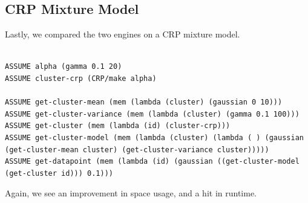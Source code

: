 \documentclass[10pt]{article}
\begin{document}
\begin{verbatim}
\end{verbatim}

\subsection{CRP Mixture Model}

Lastly, we compared the two engines on a CRP mixture model.

\begin{leftbar} \begin{small} \begin{verbatim}

ASSUME alpha (gamma 0.1 20)
ASSUME cluster-crp (CRP/make alpha)

ASSUME get-cluster-mean (mem (lambda (cluster) (gaussian 0 10)))
ASSUME get-cluster-variance (mem (lambda (cluster) (gamma 0.1 100)))
ASSUME get-cluster (mem (lambda (id) (cluster-crp)))
ASSUME get-cluster-model (mem (lambda (cluster) (lambda ( ) (gaussian (get-cluster-mean cluster) (get-cluster-variance cluster)))))
ASSUME get-datapoint (mem (lambda (id) (gaussian ((get-cluster-model (get-cluster id))) 0.1)))
\end{verbatim} \end{small} \end{leftbar}

Again, we see an improvement in space usage, and a hit in runtime.
\end{document}
